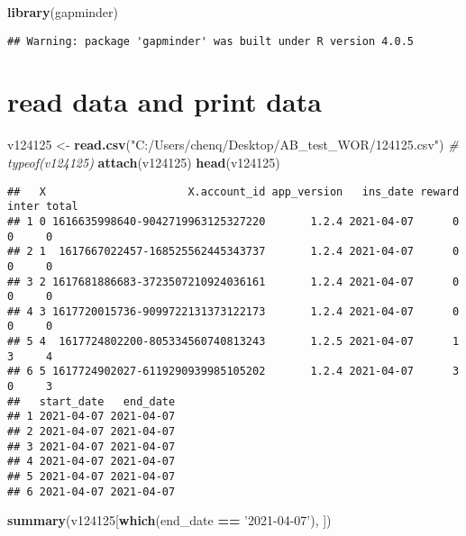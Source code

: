 \documentclass[
]{article}
\newenvironment{Shaded}{\begin{snugshade}}{\end{snugshade}}
\newcommand{\CommentTok}[1]{\textcolor[rgb]{0.56,0.35,0.01}{\textit{#1}}}
\newcommand{\KeywordTok}[1]{\textcolor[rgb]{0.13,0.29,0.53}{\textbf{#1}}}
\newcommand{\NormalTok}[1]{#1}
\newcommand{\OperatorTok}[1]{\textcolor[rgb]{0.81,0.36,0.00}{\textbf{#1}}}
\newcommand{\StringTok}[1]{\textcolor[rgb]{0.31,0.60,0.02}{#1}}
\begin{document}
\begin{Shaded}
\begin{Highlighting}[]
\KeywordTok{library}\NormalTok{(gapminder)}
\end{Highlighting}
\end{Shaded}

\begin{verbatim}
## Warning: package 'gapminder' was built under R version 4.0.5
\end{verbatim}

\hypertarget{read-data-and-print-data}{%
\section{read data and print data}\label{read-data-and-print-data}}

\begin{Shaded}
\begin{Highlighting}[]
\NormalTok{v124125 <-}\StringTok{ }\KeywordTok{read.csv}\NormalTok{(}\StringTok{"C:/Users/chenq/Desktop/AB_test_WOR/124125.csv"}\NormalTok{) }\CommentTok{# typeof(v124125)}
\KeywordTok{attach}\NormalTok{(v124125)}
\KeywordTok{head}\NormalTok{(v124125)}
\end{Highlighting}
\end{Shaded}

\begin{verbatim}
##   X                      X.account_id app_version   ins_date reward inter total
## 1 0 1616635998640-9042719963125327220       1.2.4 2021-04-07      0     0     0
## 2 1  1617667022457-168525562445343737       1.2.4 2021-04-07      0     0     0
## 3 2 1617681886683-3723507210924036161       1.2.4 2021-04-07      0     0     0
## 4 3 1617720015736-9099722131373122173       1.2.4 2021-04-07      0     0     0
## 5 4  1617724802200-805334560740813243       1.2.5 2021-04-07      1     3     4
## 6 5 1617724902027-6119290939985105202       1.2.4 2021-04-07      3     0     3
##   start_date   end_date
## 1 2021-04-07 2021-04-07
## 2 2021-04-07 2021-04-07
## 3 2021-04-07 2021-04-07
## 4 2021-04-07 2021-04-07
## 5 2021-04-07 2021-04-07
## 6 2021-04-07 2021-04-07
\end{verbatim}

\begin{Shaded}
\begin{Highlighting}[]
\KeywordTok{summary}\NormalTok{(v124125[}\KeywordTok{which}\NormalTok{(end_date }\OperatorTok{==}\StringTok{ '2021-04-07'}\NormalTok{), ])}
\end{Highlighting}
\end{Shaded}
\end{document}
